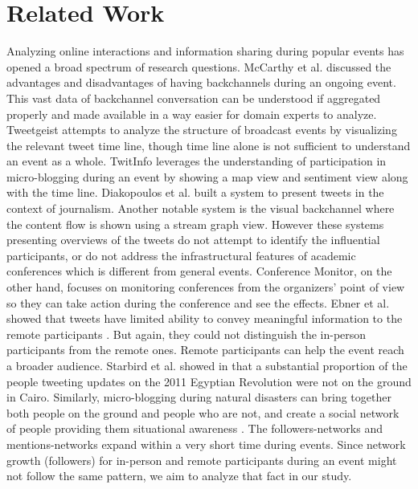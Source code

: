 \documentclass[conference,final]{IEEEtran}
\begin{document}
\section{Related Work}
Analyzing online interactions and information sharing during popular events has opened a broad spectrum of research questions. McCarthy et al. \cite{danah} discussed the advantages and disadvantages of having backchannels during an ongoing event. This vast data of backchannel conversation can be understood if aggregated properly and made available in a way easier for domain experts to analyze. Tweetgeist \cite{Tweetgeist} attempts to analyze the structure of broadcast events by visualizing the relevant tweet time line, though time line alone is not sufficient to understand an event as a whole. TwitInfo \cite{twitinfo} leverages the understanding of participation in micro-blogging during an event by showing a map view and sentiment view along with the time line. Diakopoulos et al. \cite{Diakopoulos} built a system to present tweets in the context of journalism. Another notable system is the visual backchannel\cite{backchannel} where the content flow is shown using a stream graph view. However these systems presenting overviews of the tweets do not attempt to identify the influential participants, or do not address the infrastructural features of academic conferences which is different from general events. Conference Monitor, on the other hand, focuses on monitoring conferences from the organizers' point of view so they can take action during the conference and see the effects. Ebner et al. showed that tweets have limited ability to convey meaningful information to the remote participants \cite{granular}. But again, they could not distinguish the in-person participants from the remote ones. Remote participants can help the event reach a broader audience. Starbird et al. showed in \cite{revolution} that a substantial proportion of the people tweeting updates on the 2011 Egyptian Revolution were not on the ground in Cairo. Similarly, micro-blogging during natural disasters can bring together both people on the ground and people who are not, and create a social network of people providing them situational awareness \cite{disaster}. The followers-networks and mentions-networks expand within a very short time during events. Since network growth (followers) for in-person and remote participants during an event might not follow the same pattern, we aim to analyze that fact in our study. 
\end{document}
